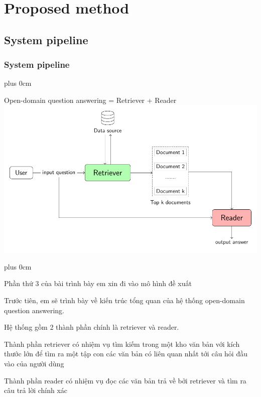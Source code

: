 \documentclass[11pt]{beamer}
\renewcommand{\raggedright}{\leftskip=0pt \rightskip=0pt plus 0cm}
\let\olditemize=\itemize
\renewenvironment{itemize}{\olditemize\raggedright}{\endlist}
\begin{document}
\section{Proposed method}
\subsection{System pipeline}
\begin{frame}
	\frametitle{System pipeline}
	\begin{itemize}
		\item Open-domain question answering = Retriever + Reader
	\end{itemize}
	\hspace*{-15pt}
	\includegraphics[scale=.68]{images/PDF/overall_arch/architecture.pdf}
\end{frame}
\begin{frame}
\begin{itemize}
	\item Phần thứ 3 của bài trình bày em xin đi vào mô hình đề xuất
	\item Trước tiên, em sẽ trình bày về kiến trúc tổng quan của hệ thống open-domain question answering.
	\item Hệ thống gồm 2 thành phần chính là retriever và reader.
	\item Thành phần retriever có nhiệm vụ tìm kiếm trong một kho văn bản với kích thước lớn để tìm ra một tập con các văn bản có liên quan nhất tới câu hỏi đầu vào của người dùng
	\item Thành phần reader có nhiệm vụ đọc các văn bản trả về bởi retriever và tìm ra câu trả lời chính xác
\end{itemize}
\end{frame}
\end{document}
